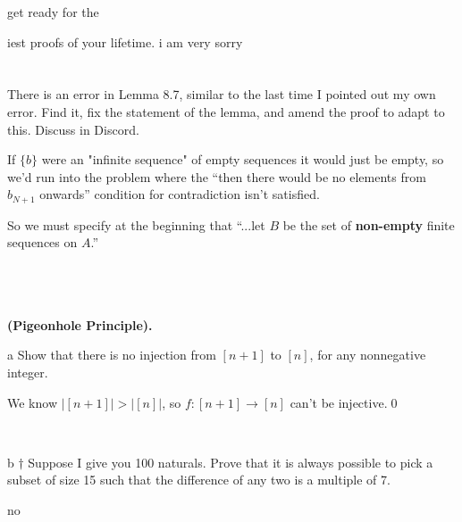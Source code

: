 \documentclass{article}
\begin{document}

get ready for the  iest proofs of your lifetime. i am very sorry
\section{}

\begin{problem*}
There is an error in Lemma 8.7, similar to the last time I pointed out my own error. Find it, fix the statement of the lemma, and amend the proof to adapt to this. Discuss in Discord.
\end{problem*}

If $\{b\}$ were an "infinite sequence" of empty sequences it would just be empty, so we'd run into the problem where the ``then there would be no elements from $b_{N+1}$ onwards'' condition for contradiction isn't satisfied. 

So we must specify at the beginning that ``...let $B$ be the set of \textbf{non-empty} finite sequences on $A$.''

\
\hline
\section{}

\begin{problem*}
\textbf{(Pigeonhole Principle).}
\end{problem*}

\begin{problem} a
Show that there is no injection from $[n+1]$ to $[n]$, for any nonnegative integer. 
\end{problem}

We know $|[ n+1] | >|[ n] |$, so $f:[ n+1]\rightarrow [ n]$ can't be injective.\qed

\

\begin{problem} b
$\dagger$ Suppose I give you 100 naturals. Prove that it is always possible to pick a subset of size 15 such that the difference of any two is a multiple of 7.
\end{problem}

no
\end{document}
